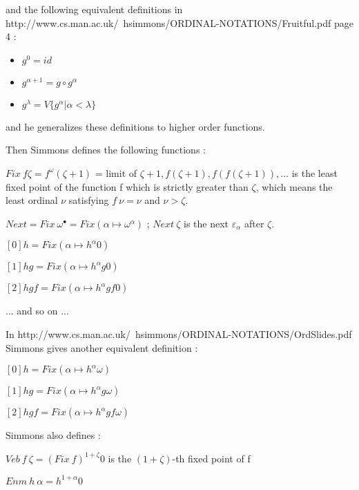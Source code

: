 \documentclass[10pt]{article}
\begin{document}
and the following equivalent definitions in http://www.cs.man.ac.uk/~hsimmons/ORDINAL-NOTATIONS/Fruitful.pdf page 4 :

\begin{itemize}
     \setlength{\itemsep}{1pt}
     \setlength{\parskip}{0pt}
     \setlength{\parsep}{0pt}
\item \( g^0 = id \)
\item \( g^{\alpha+1} = g \circ g^\alpha \)
\item \( g^\lambda = V \lbrace g^\alpha | \alpha < \lambda \rbrace \)
\end{itemize}

\bigskip

and he generalizes these definitions to higher order functions.

\bigskip

Then Simmons defines the following functions :


\( Fix\ f \zeta = f^\omega (\zeta+1) \) = limit of \( \zeta+1, f (\zeta+1), f (f (\zeta+1)), \ldots \) is the least fixed point of the function f which is strictly greater than \( \zeta \), which means the least ordinal \( \nu \) satisfying \( f\ \nu = \nu \) and \( \nu > \zeta \).

\( Next = Fix\ \omega^\bullet = Fix (\alpha \mapsto \omega^\alpha) \) ; \( Next\ \zeta \) is the next \( \varepsilon_\alpha \) after \( \zeta \).

\( [0] h = Fix (\alpha \mapsto h^\alpha 0) \)

\( [1] h g = Fix (\alpha \mapsto h^\alpha g 0) \)

\( [2] h g f = Fix (\alpha \mapsto h^\alpha g f 0) \) 

... and so on ...

\bigskip

In http://www.cs.man.ac.uk/~hsimmons/ORDINAL-NOTATIONS/OrdSlides.pdf Simmons gives another equivalent definition :

\( [0] h = Fix (\alpha \mapsto h^\alpha \omega) \)

\( [1] h g = Fix (\alpha \mapsto h^\alpha g \omega) \)

\( [2] h g f = Fix (\alpha \mapsto h^\alpha g f \omega) \) 

\bigskip

Simmons also defines : 

\( Veb\ f\ \zeta = (Fix\ f)^{1+\zeta} 0 \) is the \( (1+\zeta) \)-th fixed point of f

\( Enm\ h\ \alpha = h^{1+\alpha} 0 \)
\end{document}
